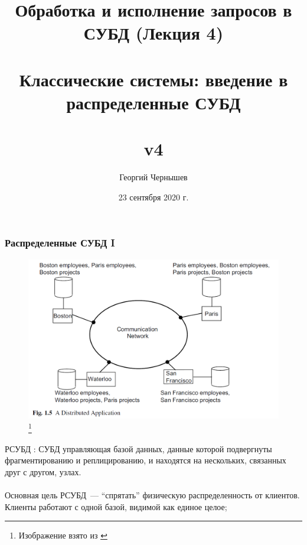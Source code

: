 \documentclass{beamer}
\title[Обработка и исполнение запросов: лекция 4]{Обработка и исполнение запросов в СУБД (Лекция 4) \\~\\ Классические системы: введение в распределенные СУБД\\~\\ v4} %
\author{Георгий Чернышев} %
\institute[ВШЭ] %
{
Высшая Школа Экономики \\ %
\medskip
\textit{chernishev@gmail.com} %
}
\date{23 сентября 2020 г.}
\begin{document}
\begin{frame}
\titlepage %
\end{frame}

\begin{frame}
\frametitle{Распределенные СУБД I}

\begin{figure}[htb]
\includegraphics[width=\textwidth,height=0.50\textheight,keepaspectratio]{ozsu-1.png} 
\footnote{\tiny{Изображение взято из \cite{Ozsu2011}}}
\end{figure}
{\scriptsize
РСУБД \cite{Elnikety2009}: СУБД управляющая базой данных, данные которой подвергнуты фрагментированию и реплицированию, и находятся на нескольких, связанных друг с другом, узлах.
\\~\\
Основная цель РСУБД~--- ``спрятать'' физическую распределенность от клиентов. Клиенты работают с одной базой, видимой как единое целое;
}
\end{frame}
\end{document}
